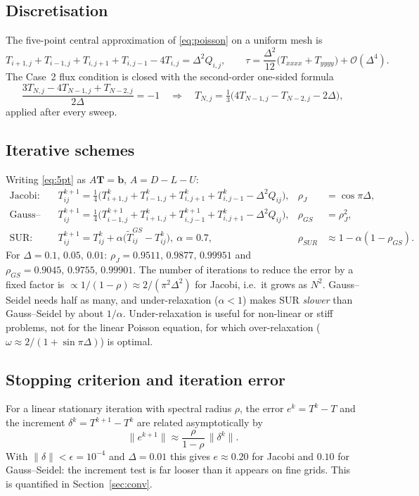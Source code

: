 \subsection{Discretisation}
The five-point central approximation of \eqref{eq:poisson} on a uniform mesh is
\begin{equation}
T_{i+1,j}+T_{i-1,j}+T_{i,j+1}+T_{i,j-1}-4T_{i,j}=\Delta^2Q_{i,j},\qquad \tau=\frac{\Delta^2}{12}\big(T_{xxxx}+T_{yyyy}\big)+\mathcal{O}(\Delta^4). \label{eq:5pt}
\end{equation}
The Case~2 flux condition is closed with the second-order one-sided formula
\begin{equation}
\frac{3T_{N,j}-4T_{N-1,j}+T_{N-2,j}}{2\Delta}=-1\quad\Longrightarrow\quad T_{N,j}=\tfrac13\big(4T_{N-1,j}-T_{N-2,j}-2\Delta\big),
\end{equation}
applied after every sweep.

\subsection{Iterative schemes}
Writing \eqref{eq:5pt} as $A\mathbf{T}=\mathbf{b}$, $A=D-L-U$:
\begin{align}
\text{Jacobi:}\quad& T^{k+1}_{ij}=\tfrac14\big(T^k_{i+1,j}+T^k_{i-1,j}+T^k_{i,j+1}+T^k_{i,j-1}-\Delta^2Q_{ij}\big), &\rho_J&=\cos\pi\Delta,\\
\text{Gauss--Seidel:}\quad& T^{k+1}_{ij}=\tfrac14\big(T^{k+1}_{i-1,j}+T^{k}_{i+1,j}+T^{k+1}_{i,j-1}+T^{k}_{i,j+1}-\Delta^2Q_{ij}\big), &\rho_{GS}&=\rho_J^2,\\
\text{SUR:}\quad& T^{k+1}_{ij}=T^k_{ij}+\alpha\big(\tilde T^{GS}_{ij}-T^k_{ij}\big),\ \alpha=0.7, &\rho_{SUR}&\approx1-\alpha(1-\rho_{GS}).
\end{align}
For $\Delta=0.1,\,0.05,\,0.01$: $\rho_J=0.9511,\,0.9877,\,0.99951$ and $\rho_{GS}=0.9045,\,0.9755,\,0.99901$. The number of iterations to reduce the error by a fixed factor is $\propto1/(1-\rho)\approx2/(\pi^2\Delta^2)$ for Jacobi, i.e.\ it grows as $N^2$. Gauss--Seidel needs half as many, and under-relaxation ($\alpha<1$) makes SUR \emph{slower} than Gauss--Seidel by about $1/\alpha$. Under-relaxation is useful for non-linear or stiff problems, not for the linear Poisson equation, for which over-relaxation ($\omega\approx2/(1+\sin\pi\Delta)$) is optimal.

\subsection{Stopping criterion and iteration error}
For a linear stationary iteration with spectral radius $\rho$, the error $e^k=T^k-T$ and the increment $\delta^k=T^{k+1}-T^k$ are related asymptotically by
\begin{equation}
\|e^{k+1}\|\approx\frac{\rho}{1-\rho}\,\|\delta^k\| .\label{eq:err}
\end{equation}
With $\|\delta\|<\epsilon=10^{-4}$ and $\Delta=0.01$ this gives $e\approx0.20$ for Jacobi and $0.10$ for Gauss--Seidel: the increment test is far looser than it appears on fine grids. This is quantified in Section~\ref{sec:conv}.

